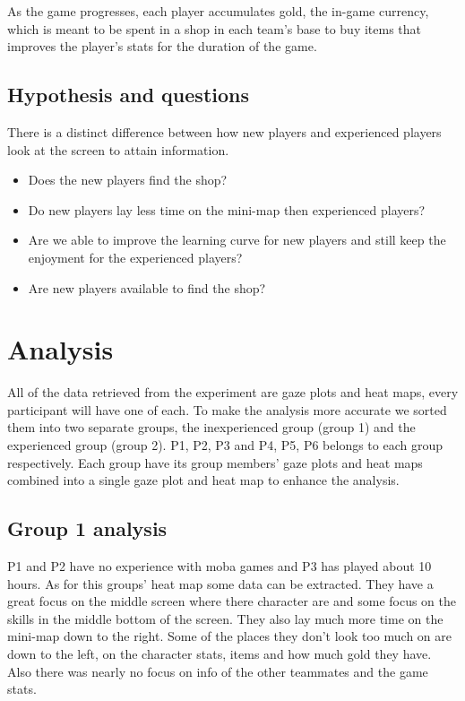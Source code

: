 \documentclass[notitlepage]{report}
\begin{document}
As the game progresses, each player accumulates gold, the in-game currency, which is meant to be spent in a shop in each team's base to buy items that improves the player's stats for the duration of the game.

\section{Hypothesis and questions}
There is a distinct difference between how new players and experienced players look at the screen to attain information.

\begin{itemize}
\item Does the new players find the shop?
\item Do new players lay less time on the mini-map then experienced players?
\item Are we able to improve the learning curve for new players and still keep the enjoyment for the experienced players?
\item Are new players available to find the shop?
\end{itemize}

\chapter{Analysis}
All of the data retrieved from the experiment are gaze plots and heat maps, every participant will have one of each. To make the analysis more accurate we sorted them into two separate groups, the inexperienced group (group 1) and the experienced group (group 2). P1, P2, P3 and P4, P5, P6 belongs to each group respectively. Each group have its group members’ gaze plots and heat maps combined into a single gaze plot and heat map to enhance the analysis.

\section{Group 1 analysis}
P1 and P2 have no experience with moba games and P3 has played about 10 hours. As for this groups’ heat map some data can be extracted. They have a great focus on the middle screen where there character are and some focus on the skills in the middle bottom of the screen.  They also lay much more time on the mini-map down to the right. Some of the places they don't look too much on are down to the left, on the character stats, items and how much gold they have. Also there was nearly no focus on info of the other teammates and the game stats.
\end{document}
